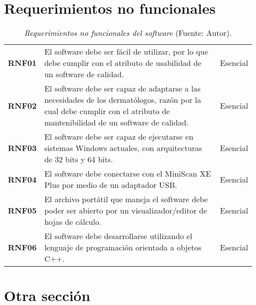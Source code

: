 \section{Requerimientos no funcionales}
	\blindtext
	
	\begin{table}[t]
		\small
		\caption[Requerimientos no funcionales del software]{\textit{Requerimientos no funcionales del software} (Fuente: Autor).}
		\centering
		\setlength{\extrarowheight}{\altocelda}
		\begin{tabulary}{\anchotabla}{|c|J|c|}
			\hline
			 &  & \\ \hline
			\textbf{RNF01} & El software debe ser f\'{a}cil de utilizar, por lo que debe cumplir con el atributo de usabilidad de un software de calidad. & Esencial\\ \hline
			\textbf{RNF02} & El software debe ser capaz de adaptarse a las necesidades de los dermat\'{o}logos, raz\'{o}n por la cual debe cumplir con el atributo de mantenibilidad de un software de calidad. & Esencial\\ \hline
			\textbf{RNF03} & El software debe ser capaz de ejecutarse en sistemas Windows actuales, con arquitecturas de 32 bits y 64 bits. & Esencial\\ \hline
			\textbf{RNF04} & El software debe conectarse con el MiniScan XE Plus por medio de un adaptador USB. & Esencial\\ \hline
			\textbf{RNF05} & El archivo port\'{a}til que maneja el software debe poder ser abierto por un visualizador/editor de hojas de c\'{a}lculo. & Esencial\\ \hline
			\textbf{RNF06} & El software debe desarrollarse utilizando el lenguaje de programaci\'{o}n orientada a objetos C++. & Esencial\\ \hline
		\end{tabulary}
	\end{table}
	
\section{Otra secci\'{o}n}
	\blindtext